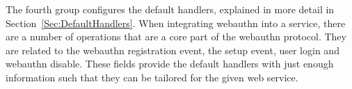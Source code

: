



The fourth group configures the default handlers, explained in more detail in Section~\ref{Sec:DefaultHandlers}. When integrating webauthn into a service, there are a number of operations that are a core part of the webauthn protocol. They are related to the webauthn registration event, the setup event, user login and webauthn disable. These fields provide the default handlers with just enough information such that they can be tailored for the given web service.







